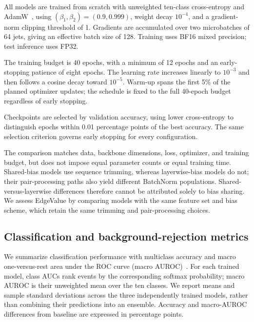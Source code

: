 All models are trained from scratch with unweighted ten-class cross-entropy and
AdamW~\citep{Loshchilov2019AdamW}, using $(\beta_1,\beta_2)=(0.9,0.999)$,
weight decay $10^{-4}$, and a gradient-norm clipping threshold of 1.
Gradients are accumulated over two microbatches of 64 jets, giving an effective
batch size of 128. Training uses BF16 mixed precision; test inference uses FP32.

The training budget is 40 epochs, with a minimum of 12 epochs and an early-stopping
patience of eight epochs. The learning rate increases linearly to $10^{-3}$ and
then follows a cosine decay toward $10^{-5}$. Warm-up spans the first 5\% of
the planned optimizer updates; the schedule is fixed to the full 40-epoch
budget regardless of early stopping.

Checkpoints are selected by validation accuracy, using lower cross-entropy
to distinguish epochs within 0.01 percentage points of the best accuracy.
The same selection criterion governs early stopping for every configuration.

The comparison matches data, backbone dimensions, loss, optimizer, and training
budget, but does not impose equal parameter counts or equal training time.
Shared-bias models use sequence trimming, whereas layerwise-bias models do not;
their pair-processing paths also yield different BatchNorm populations.
Shared-versus-layerwise differences therefore cannot be attributed solely to
bias sharing. We assess EdgeValue by comparing models with the same feature
set and bias scheme, which retain the same trimming and pair-processing choices.

\subsection{Classification and background-rejection metrics}
We summarize classification performance with multiclass accuracy and macro
one-versus-rest area under the ROC curve (macro AUROC)~\citep{Fawcett2006ROC}.
For each trained model, class AUCs rank events by the corresponding softmax
probability; macro AUROC is their unweighted mean over the ten classes.
We report means and sample standard deviations across the three independently
trained models, rather than combining their predictions into an ensemble.
Accuracy and macro-AUROC differences from baseline are expressed in percentage
points.

